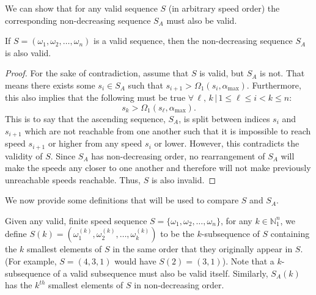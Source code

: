 We can show that for any valid sequence $S$ (in arbitrary speed order) the corresponding non-decreasing sequence $S_A$ must also be valid.

\begin{property}\label{prop:non-dec-valid}
If $S= (\omega_1, \omega_2, \ldots, \omega_n)$ is a valid sequence, then the non-decreasing sequence $S_A$ is also valid.
\end{property}
\begin{proof}
For the sake of contradiction, assume that $S$ is valid, but $S_A$ is not.
 That means there exists some $s_i \in S_A$ such that $s_{i+1} > \Omega_1(s_i, \alpha_{\max})$.  Furthermore, this also implies that the following must be true $\forall \, \ell, \, k \, | \, 1 \leq \ell \leq i < k \leq n$:
\begin{equation}
    s_k > \Omega_1(s_\ell, \alpha_{\max}).
\end{equation}
\noindent This is to say that the ascending sequence, $S_A$, is split between indices $s_i$ and $s_{i+1}$ which are not reachable from one another such that it is impossible to reach speed $s_{i+1}$ or higher from any speed $s_i$ or lower.
However, this contradicts the validity of $S$.
Since $S_A$ has non-decreasing order, no rearrangement of $S_A$ will make the speeds any closer to one another and therefore will not make previously unreachable speeds reachable.
Thus, $S$ is also invalid.
\end{proof}

We now provide some definitions that will be used to compare $S$ and $S_A$.

\begin{definition}[$k$-Subsequence of $S$]\label{def:k-subsequence}
Given any valid, finite speed sequence $S = \{\omega_1, \omega_2, \ldots, \omega_n\}$, for any $k \in \mathbb{N}_1^n$, we define $S(k) = (\omega^{(k)}_1, \omega^{(k)}_2, \ldots, \omega^{(k)}_k)$ to be the $k$-subsequence of $S$ containing the $k$ smallest elements of $S$ in the same order that they originally appear in $S$.
 (For example, $S= (4, 3, 1)$ would have $S(2) = (3,1)$).
 Note that a $k$-subsequence of a valid subsequence must also be valid itself.
Similarly, $S_A(k)$ has the $k^{th}$ smallest elements of $S$ in non-decreasing order.
\end{definition}


